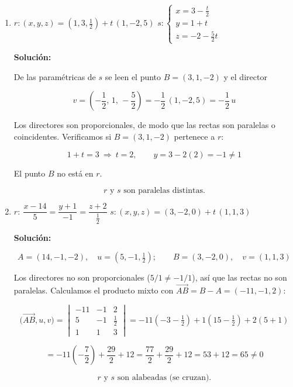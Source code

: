 \documentclass[12pt]{article}
\newcommand{\solucion}{%
    \vspace{0.8em}%
    \textbf{Solución:}%
    \vspace{0.8em}%
}
\begin{document}
\begin{enumerate}[label=\alph*.-]

    \item $r:(x,y,z)=\left(1,3,\tfrac{1}{2}\right)+t\,(1,-2,5)$ \quad
    $s:\begin{cases}
    x=3-\tfrac{t}{2}\\[2pt]
    y=1+t\\[2pt]
    z=-2-\tfrac{5}{2}t
    \end{cases}$

    \solucion

    De las paramétricas de $s$ se leen el punto $B=(3,1,-2)$ y el director

    \[
    v=\left(-\frac{1}{2},\,1,\,-\frac{5}{2}\right)
    =-\frac{1}{2}\,(1,-2,5)=-\frac{1}{2}\,u
    \]

    Los directores son proporcionales, de modo que las rectas son paralelas
    o coincidentes. Verificamos si $B=(3,1,-2)$ pertenece a $r$:

    \[
    1+t=3\ \Longrightarrow\ t=2,\qquad
    y=3-2(2)=-1\neq1
    \]

    El punto $B$ no está en $r$.

    \[
    \boxed{r \text{ y } s \text{ son paralelas distintas.}}
    \]

    \item $r:\ \dfrac{x-14}{5}=\dfrac{y+1}{-1}=\dfrac{z+2}{\tfrac{1}{2}}$
    \quad $s:(x,y,z)=(3,-2,0)+t\,(1,1,3)$

    \solucion

    \[
    A=(14,-1,-2),\quad u=\left(5,-1,\tfrac{1}{2}\right);\qquad
    B=(3,-2,0),\quad v=(1,1,3)
    \]

    Los directores no son proporcionales ($5/1\neq-1/1$), así que las rectas
    no son paralelas. Calculamos el producto mixto con
    $\overrightarrow{AB}=B-A=(-11,-1,2)$:

    \[
    \big(\overrightarrow{AB},u,v\big)=\begin{vmatrix}
    -11 & -1 & 2\\[2pt]
    5 & -1 & \tfrac{1}{2}\\[2pt]
    1 & 1 & 3
    \end{vmatrix}
    =-11\left(-3-\tfrac{1}{2}\right)+1\left(15-\tfrac{1}{2}\right)+2(5+1)
    \]

    \[
    =-11\left(-\frac{7}{2}\right)+\frac{29}{2}+12
    =\frac{77}{2}+\frac{29}{2}+12=53+12=65\neq0
    \]

    \[
    \boxed{r \text{ y } s \text{ son alabeadas (se cruzan).}}
    \]


\end{enumerate}
\end{document}

